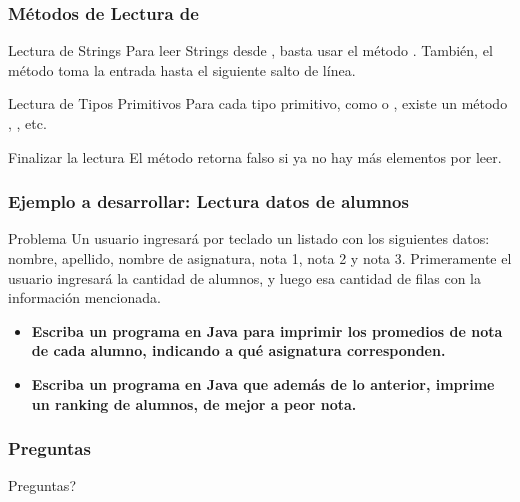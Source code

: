\documentclass{beamer}
\begin{document}
\begin{frame}
  \frametitle{Métodos de Lectura de }

  \begin{block}{Lectura de Strings}
    Para leer Strings desde , basta usar el método
    . También, el método  toma la entrada
    hasta el siguiente salto de línea.
  \end{block}

  \begin{block}{Lectura de Tipos Primitivos}
    Para cada tipo primitivo, como  o ,
    existe un método , , etc.
  \end{block}

  \begin{block}{Finalizar la lectura}
    El método  retorna falso si ya no hay más
    elementos por leer.
  \end{block}
  
\end{frame}

\begin{frame}
  \frametitle{Ejemplo a desarrollar: Lectura datos de alumnos}

  \begin{block}{Problema}
    Un usuario ingresará por teclado un listado con los siguientes
    datos: nombre, apellido, nombre de asignatura, nota 1, nota 2 y
    nota 3. Primeramente el usuario ingresará la cantidad de alumnos,
    y luego esa cantidad de filas con la información mencionada.

    \begin{itemize}
    \item \textbf{Escriba un programa en Java para imprimir los
        promedios de nota de cada alumno, indicando a qué asignatura
        corresponden.}
     
    \item \textbf{Escriba un programa en Java que además de lo
        anterior, imprime un ranking de alumnos, de mejor a peor
        nota.}      
    \end{itemize}

  \end{block}

\end{frame}

\begin{frame}
  \frametitle{Preguntas}
  \hspace{4cm}\huge{Preguntas?}  
\end{frame}
\end{document}
